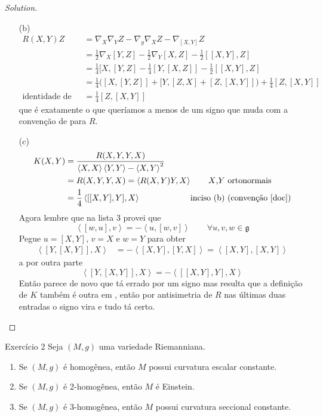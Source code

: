 \begin{proof}[Solution]\leavevmode
\begin{enumerate}[label=(\alph*)]
	\item[(b)] 
		\begin{align*}
			R(X,Y)Z&=\nabla_X\nabla_YZ-\nabla_y\nabla_XZ-\nabla_{[X,Y]}Z\\
			       &=\frac{1}{2}\nabla_X[Y,Z]-\frac{1}{2}\nabla_Y[X,Z]-\frac{1}{2}[[X,Y],Z]\\
			       &=\frac{1}{4}[X,[Y,Z]-\frac{1}{4}[Y,[X,Z]]-\frac{1}{2}[[X,Y],Z]\\
			       &=\frac{1}{4}\Big([X,[Y,Z]]+[Y,[Z,X]+[Z,[X,Y]]\Big)+\frac{1}{4}[Z,[X,Y]]\\
			\text{identidade de Jacobi} \qquad &=\frac{1}{4}[Z,[X,Y]]
		\end{align*}
		que é exatamente o que queríamos a menos de um signo que muda com a convenção de \cite{doc} para \(R\).

	\item[(c)]
		\begin{align*}
		K(X,Y)&=\frac{R(X,Y,Y,X)}{\left<X,X\right>\left<Y,Y\right>-\left<X,Y\right>^2}\\
	&=R(X,Y,Y,X)=\left<R(X,Y)Y,X\right>\qquad 	\text{\(X\),\(Y\) ortonormais}\\
	&=\frac{1}{4}\left<[[X,Y],Y],X\right>\qquad \qquad \qquad 	\text{inciso (b) (convenção \cite{doc})}\\
		\end{align*}
		Agora lembre que na lista 3 provei que
		\[\left<[w,u],v\right>=-\left<u,[w,v]\right>\qquad \forall u,v,w \in \mathfrak{g}\]
		Pegue \(u=[X,Y]\), \(v=X\) e \(w=Y\) para obter
	\begin{align*}
		\left<[Y,[X,Y]],X\right>&=-\left<[X,Y],[Y,X]\right>=\left<[X,Y],[X,Y]\right>
	\end{align*}
	a por outra parte
	\[\left<[Y,[X,Y]],X\right>=-\left<[[X,Y],Y],X\right>\]
Então parece de novo que tá errado por um signo mas resulta que a definição de \(K\) também é outra em \cite{doc}, então por antisimetria de \(R\) nas últimas duas entradas o signo vira e tudo tá certo.
\end{enumerate}

\end{proof}

\begin{thing4}{Exercício 2}\label{exer:2}\leavevmode
Seja \((M,g)\) uma variedade Riemanniana.
\begin{enumerate}[label=(\alph*)]
\item Se \((M,g)\) é homogênea, então \(M\) possui curvatura escalar constante.
\item  Se \((M,g)\) é 2-homogênea, então \(M\) é Einstein.
\item Se \((M,g)\) é 3-homogênea, então \(M\) possui curvatura seccional constante.
\end{enumerate}
\end{thing4}

